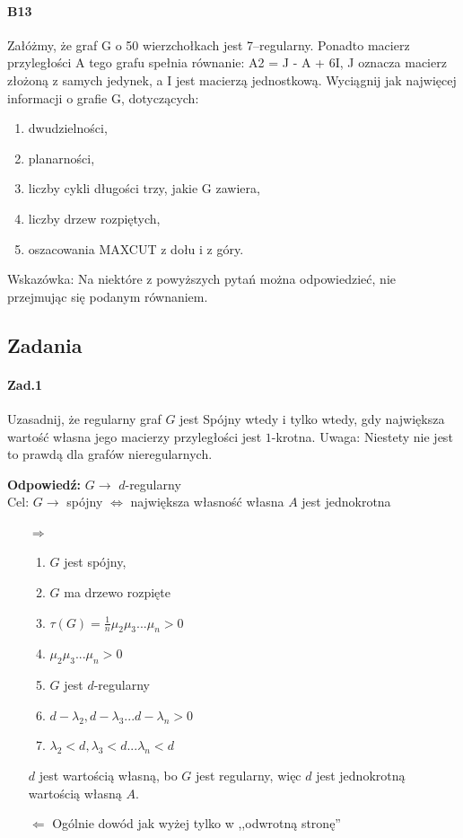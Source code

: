 \documentclass[a4paper,12pt]{article}
\theoremstyle{definition}%
\theoremstyle{definition}
\theoremstyle{problem}
\begin{document}
\paragraph{B13} Załóżmy, że graf G o 50 wierzchołkach jest 7–regularny. Ponadto macierz przyległości A tego grafu spełnia równanie: A2 = J - A + 6I,
J oznacza macierz złożoną z samych jedynek, a I jest macierzą jednostkową. Wyciągnij jak najwięcej informacji o grafie G, dotyczących:
\begin{enumerate}[label=\alph*)]
\item dwudzielności,
\item planarności,
\item liczby cykli długości trzy, jakie G zawiera,
\item liczby drzew rozpiętych,
\item oszacowania MAXCUT z dołu i z góry.
\end{enumerate}
Wskazówka: Na niektóre z powyższych pytań można odpowiedzieć, nie przejmując się podanym równaniem.

\subsection{Zadania}
\paragraph{Zad.1} Uzasadnij, że regularny graf $G$ jest Spójny wtedy i tylko wtedy, gdy największa wartość własna jego macierzy przyległości jest $1$-krotna. Uwaga: Niestety nie jest to prawdą dla grafów nieregularnych.

\textbf{Odpowiedź: } $G\rightarrow $ $d$-regularny\\
Cel: $G\rightarrow$ spójny $\Leftrightarrow$ największa własność własna $A$ jest jednokrotna
\begin{itemize}
\item[$\Rightarrow$]
\begin{enumerate}
\item $G$ jest spójny,
\item $G$ ma drzewo rozpięte
\item $\tau (G)=\frac{1}{n}\mu_2\mu_3...\mu_n>0$
\item $\mu_2\mu_3...\mu_n>0$
\item $G$ jest $d$-regularny
\item $d-\lambda _2, d-\lambda _3...d-\lambda _n>0$
\item $\lambda _2 < d, \lambda _3<d...\lambda _n<d$
\end{enumerate}
$d$ jest wartością własną, bo $G$ jest regularny, więc $d$ jest jednokrotną wartością własną $A$.
\item[$\Leftarrow$] Ogólnie dowód jak wyżej tylko w ,,odwrotną stronę''
\end{itemize}
\end{document}
